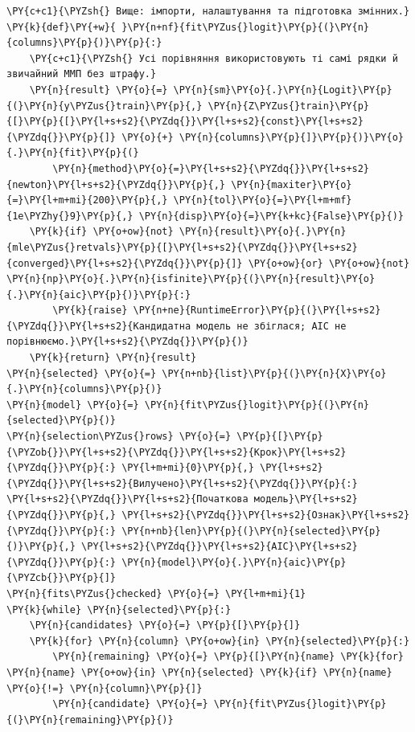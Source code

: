 \begin{Verbatim}[commandchars=\\\{\}]
\PY{c+c1}{\PYZsh{} Вище: імпорти, налаштування та підготовка змінних.}
\PY{k}{def}\PY{+w}{ }\PY{n+nf}{fit\PYZus{}logit}\PY{p}{(}\PY{n}{columns}\PY{p}{)}\PY{p}{:}
    \PY{c+c1}{\PYZsh{} Усі порівняння використовують ті самі рядки й звичайний ММП без штрафу.}
    \PY{n}{result} \PY{o}{=} \PY{n}{sm}\PY{o}{.}\PY{n}{Logit}\PY{p}{(}\PY{n}{y\PYZus{}train}\PY{p}{,} \PY{n}{Z\PYZus{}train}\PY{p}{[}\PY{p}{[}\PY{l+s+s2}{\PYZdq{}}\PY{l+s+s2}{const}\PY{l+s+s2}{\PYZdq{}}\PY{p}{]} \PY{o}{+} \PY{n}{columns}\PY{p}{]}\PY{p}{)}\PY{o}{.}\PY{n}{fit}\PY{p}{(}
        \PY{n}{method}\PY{o}{=}\PY{l+s+s2}{\PYZdq{}}\PY{l+s+s2}{newton}\PY{l+s+s2}{\PYZdq{}}\PY{p}{,} \PY{n}{maxiter}\PY{o}{=}\PY{l+m+mi}{200}\PY{p}{,} \PY{n}{tol}\PY{o}{=}\PY{l+m+mf}{1e\PYZhy{}9}\PY{p}{,} \PY{n}{disp}\PY{o}{=}\PY{k+kc}{False}\PY{p}{)}
    \PY{k}{if} \PY{o+ow}{not} \PY{n}{result}\PY{o}{.}\PY{n}{mle\PYZus{}retvals}\PY{p}{[}\PY{l+s+s2}{\PYZdq{}}\PY{l+s+s2}{converged}\PY{l+s+s2}{\PYZdq{}}\PY{p}{]} \PY{o+ow}{or} \PY{o+ow}{not} \PY{n}{np}\PY{o}{.}\PY{n}{isfinite}\PY{p}{(}\PY{n}{result}\PY{o}{.}\PY{n}{aic}\PY{p}{)}\PY{p}{:}
        \PY{k}{raise} \PY{n+ne}{RuntimeError}\PY{p}{(}\PY{l+s+s2}{\PYZdq{}}\PY{l+s+s2}{Кандидатна модель не збіглася; AIC не порівнюємо.}\PY{l+s+s2}{\PYZdq{}}\PY{p}{)}
    \PY{k}{return} \PY{n}{result}
\PY{n}{selected} \PY{o}{=} \PY{n+nb}{list}\PY{p}{(}\PY{n}{X}\PY{o}{.}\PY{n}{columns}\PY{p}{)}
\PY{n}{model} \PY{o}{=} \PY{n}{fit\PYZus{}logit}\PY{p}{(}\PY{n}{selected}\PY{p}{)}
\PY{n}{selection\PYZus{}rows} \PY{o}{=} \PY{p}{[}\PY{p}{\PYZob{}}\PY{l+s+s2}{\PYZdq{}}\PY{l+s+s2}{Крок}\PY{l+s+s2}{\PYZdq{}}\PY{p}{:} \PY{l+m+mi}{0}\PY{p}{,} \PY{l+s+s2}{\PYZdq{}}\PY{l+s+s2}{Вилучено}\PY{l+s+s2}{\PYZdq{}}\PY{p}{:} \PY{l+s+s2}{\PYZdq{}}\PY{l+s+s2}{Початкова модель}\PY{l+s+s2}{\PYZdq{}}\PY{p}{,} \PY{l+s+s2}{\PYZdq{}}\PY{l+s+s2}{Ознак}\PY{l+s+s2}{\PYZdq{}}\PY{p}{:} \PY{n+nb}{len}\PY{p}{(}\PY{n}{selected}\PY{p}{)}\PY{p}{,} \PY{l+s+s2}{\PYZdq{}}\PY{l+s+s2}{AIC}\PY{l+s+s2}{\PYZdq{}}\PY{p}{:} \PY{n}{model}\PY{o}{.}\PY{n}{aic}\PY{p}{\PYZcb{}}\PY{p}{]}
\PY{n}{fits\PYZus{}checked} \PY{o}{=} \PY{l+m+mi}{1}
\PY{k}{while} \PY{n}{selected}\PY{p}{:}
    \PY{n}{candidates} \PY{o}{=} \PY{p}{[}\PY{p}{]}
    \PY{k}{for} \PY{n}{column} \PY{o+ow}{in} \PY{n}{selected}\PY{p}{:}
        \PY{n}{remaining} \PY{o}{=} \PY{p}{[}\PY{n}{name} \PY{k}{for} \PY{n}{name} \PY{o+ow}{in} \PY{n}{selected} \PY{k}{if} \PY{n}{name} \PY{o}{!=} \PY{n}{column}\PY{p}{]}
        \PY{n}{candidate} \PY{o}{=} \PY{n}{fit\PYZus{}logit}\PY{p}{(}\PY{n}{remaining}\PY{p}{)}

\end{Verbatim}
